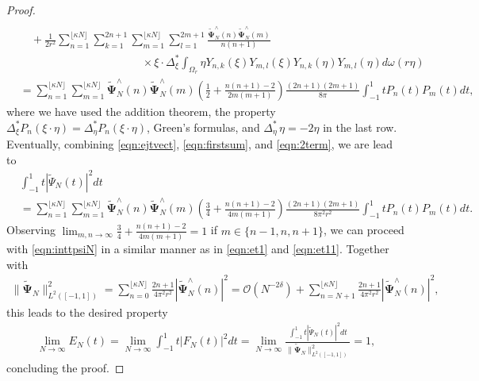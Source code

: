 \documentclass[a4paper, 10pt]{article}
\numberwithin{equation}{section}
\theoremstyle{definition}
\begin{document}
\begin{proof}
\begin{align}
\\&\quad+\frac{1}{2r^2}\sum_{n=1}^{\lfloor \kappa N\rfloor}\sum_{k=1}^{2n+1}\sum_{m=1}^{{\lfloor \kappa N\rfloor}}\sum_{l=1}^{2m+1}\frac{\tilde{\mathbf{\Psi}}_N^\wedge(n)\tilde{\mathbf{\Psi}}_N^\wedge(m)}{n(n+1)}\nonumber
\\&\qquad\qquad\qquad\quad\qquad\qquad\times\xi \cdot\Delta_{\xi }^*\int_{\Omega_r}\eta Y_{n,k}\left(\xi \right)Y_{m,l}\left(\xi \right)Y_{n,k}\left(\eta \right)Y_{m,l}\left(\eta \right)d\omega(r\eta)\nonumber
\\&=\sum_{n=1}^{\lfloor \kappa N\rfloor}\sum_{m=1}^{{\lfloor \kappa N\rfloor}}\tilde{\mathbf{\Psi}}_N^\wedge(n)\tilde{\mathbf{\Psi}}_N^\wedge(m)\left(\frac{1}{2}+\frac{n(n+1)-2}{2m(m+1)}\right)\frac{(2n+1)(2m+1)}{8\pi}\int_{-1}^1tP_n(t)P_m(t)dt,\nonumber
\end{align}\normalsize
where we have used the addition theorem, the property $\Delta_{\xi }^*P_n(\xi \cdot\eta)=\Delta_{\eta}^*P_n(\xi \cdot\eta)$, Green's formulas, and $\Delta_{\eta}^*\,\eta=-2\eta$ in the last row. Eventually, combining \eqref{eqn:ejtvect}, \eqref{eqn:firstsum}, and \eqref{eqn:2term}, we are lead to
\begin{align}\label{eqn:inttpsiN}
&\int_{-1}^1t|\tilde{\Psi}_N(t)|^2dt
\\&=\sum_{n=1}^{\lfloor \kappa N\rfloor}\sum_{m=1}^{{\lfloor \kappa N\rfloor}}\tilde{\mathbf{\Psi}}_N^\wedge(n)\tilde{\mathbf{\Psi}}_N^\wedge(m)\left(\frac{3}{4}+\frac{n(n+1)-2}{4m(m+1)}\right)\frac{(2n+1)(2m+1)}{8\pi^2r^2}\int_{-1}^1tP_n(t)P_m(t)dt.\nonumber
\end{align}\normalsize
Observing $\lim_{m,n\to\infty}\frac{3}{4}+\frac{n(n+1)-2}{4m(m+1)}=1$ if $m\in\{n-1,n,n+1\}$, we can proceed with \eqref{eqn:inttpsiN} in a similar manner as in  \eqref{eqn:et1} and \eqref{eqn:et11}. Together with
\begin{align}\label{eqn:etvect}
\|\tilde{\mathbf{\Psi}}_N\|_{L^2([-1,1])}^2=\sum_{n=0}^{\lfloor \kappa N\rfloor} \frac{2n+1}{4\pi^2r^2}|\tilde{\mathbf{\Psi}}_N^\wedge(n)|^2=\mathcal{O}(N^{-2\delta})+\sum_{n=N+1}^{\lfloor \kappa N\rfloor} \frac{2n+1}{4\pi^2r^2}|\tilde{\mathbf{\Psi}}_N^\wedge(n)|^2,
\end{align}
this leads to the desired property
\begin{align}
\lim_{N\to\infty}E_N(t)=\lim_{N\to\infty}\int_{-1}^1 t|F_N(t)|^2 dt=\lim_{N\to\infty}\frac{\int_{-1}^1 t|\tilde{\Psi}_N(t)|^2 dt}{\|\tilde{\mathbf{\Psi}}_N\|_{L^2([-1,1])}^2}=1,
\end{align}
concluding the proof.
\end{proof}
\end{document}
